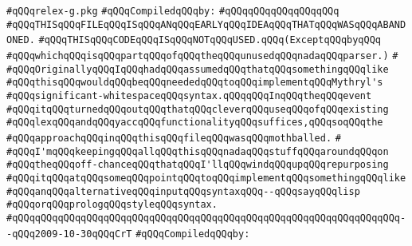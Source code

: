 \label{src/lib/compiler/front/parser/lex/relex-g.pkg}
\verb|#qQQqrelex-g.pkg|\newline
\newline
\verb|#qQQqCompiledqQQqby:|\newline
\verb|#qQQqqQQqqQQqqQQqqQQq|\newline
\newline
\verb|#qQQqTHISqQQqFILEqQQqISqQQqANqQQqEARLYqQQqIDEAqQQqTHATqQQqWASqQQqABANDONED.|\newline
\verb|#qQQqTHISqQQqCODEqQQqISqQQqNOTqQQqUSED.qQQq(ExceptqQQqbyqQQq|\newline
\verb|#qQQqwhichqQQqisqQQqpartqQQqofqQQqtheqQQqunusedqQQqnadaqQQqparser.)|\newline
\verb|#|\newline
\verb|#qQQqOriginallyqQQqIqQQqhadqQQqassumedqQQqthatqQQqsomethingqQQqlike|\newline
\verb|#qQQqthisqQQqwouldqQQqbeqQQqneededqQQqtoqQQqimplementqQQqMythryl's|\newline
\verb|#qQQqsignificant-whitespaceqQQqsyntax.qQQqqQQqInqQQqtheqQQqevent|\newline
\verb|#qQQqitqQQqturnedqQQqoutqQQqthatqQQqcleverqQQquseqQQqofqQQqexisting|\newline
\verb|#qQQqlexqQQqandqQQqyaccqQQqfunctionalityqQQqsuffices,qQQqsoqQQqthe|\newline
\verb|#qQQqapproachqQQqinqQQqthisqQQqfileqQQqwasqQQqmothballed.|\newline
\verb|#|\newline
\verb|#qQQqI'mqQQqkeepingqQQqallqQQqthisqQQqnadaqQQqstuffqQQqaroundqQQqon|\newline
\verb|#qQQqtheqQQqoff-chanceqQQqthatqQQqI'llqQQqwindqQQqupqQQqrepurposing|\newline
\verb|#qQQqitqQQqatqQQqsomeqQQqpointqQQqtoqQQqimplementqQQqsomethingqQQqlike|\newline
\verb|#qQQqanqQQqalternativeqQQqinputqQQqsyntaxqQQq--qQQqsayqQQqlisp|\newline
\verb|#qQQqorqQQqprologqQQqstyleqQQqsyntax.|\newline
\verb|#qQQqqQQqqQQqqQQqqQQqqQQqqQQqqQQqqQQqqQQqqQQqqQQqqQQqqQQqqQQqqQQqqQQq--qQQq2009-10-30qQQqCrT|\newline
\newline
\verb|#qQQqCompiledqQQqby:|\newline
